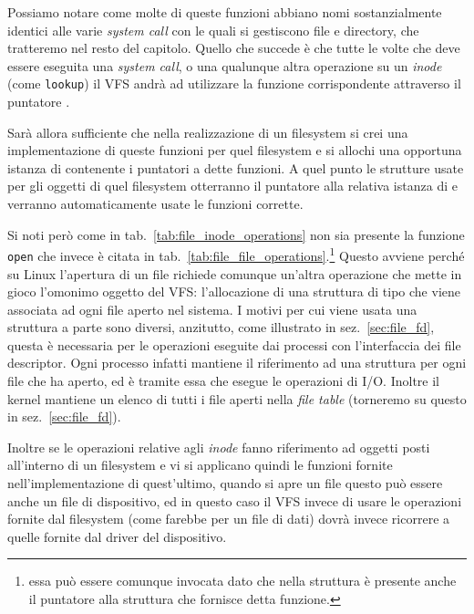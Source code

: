 Possiamo notare come molte di queste funzioni abbiano nomi sostanzialmente
identici alle varie \textit{system call} con le quali si gestiscono file e
directory, che tratteremo nel resto del capitolo. Quello che succede è che
tutte le volte che deve essere eseguita una \textit{system call}, o una
qualunque altra operazione su un \textit{inode} (come \texttt{lookup}) il VFS
andrà ad utilizzare la funzione corrispondente attraverso il puntatore
.

Sarà allora sufficiente che nella realizzazione di un filesystem si crei una
implementazione di queste funzioni per quel filesystem e si allochi una
opportuna istanza di  contenente i puntatori a dette
funzioni. A quel punto le strutture  usate per gli oggetti di
quel filesystem otterranno il puntatore alla relativa istanza di
 e verranno automaticamente usate le funzioni
corrette.

Si noti però come in tab.~\ref{tab:file_inode_operations} non sia presente la
funzione \texttt{open} che invece è citata in
tab.~\ref{tab:file_file_operations}.\footnote{essa può essere comunque
  invocata dato che nella struttura  è presente anche il
  puntatore  alla struttura  che fornisce
  detta funzione.} Questo avviene perché su Linux l'apertura di un file
richiede comunque un'altra operazione che mette in gioco l'omonimo oggetto del
VFS: l'allocazione di una struttura di tipo  che viene associata
ad ogni file aperto nel sistema.  I motivi per cui viene usata una struttura a
parte sono diversi, anzitutto, come illustrato in sez.~\ref{sec:file_fd},
questa è necessaria per le operazioni eseguite dai processi con l'interfaccia
dei file descriptor. Ogni processo infatti mantiene il riferimento ad una
struttura  per ogni file che ha aperto, ed è tramite essa che
esegue le operazioni di I/O. Inoltre il kernel mantiene un elenco di tutti i
file aperti nella \textit{file table} (torneremo su questo in
sez.~\ref{sec:file_fd}).

Inoltre se le operazioni relative agli \textit{inode} fanno riferimento ad
oggetti posti all'interno di un filesystem e vi si applicano quindi le
funzioni fornite nell'implementazione di quest'ultimo, quando si apre un file
questo può essere anche un file di dispositivo, ed in questo caso il VFS
invece di usare le operazioni fornite dal filesystem (come farebbe per un file
di dati) dovrà invece ricorrere a quelle fornite dal driver del dispositivo.

